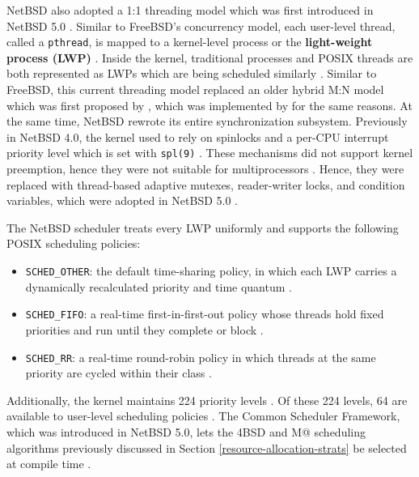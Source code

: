 NetBSD also adopted a 1:1 threading model which was first introduced in NetBSD 5.0 \parencite{rasiukevicius2009}.
Similar to FreeBSD's concurrency model, each user-level thread, called a \texttt{pthread}, is mapped to a kernel-level
process or the \textbf{light-weight process (LWP)} \parencite{rasiukevicius2009}. Inside the kernel, traditional processes
and POSIX threads are both represented as LWPs which are being scheduled similarly \parencite{rasiukevicius2009}.
Similar to FreeBSD, this current threading model replaced an older hybrid M:N model which was first proposed by
\textcite{anderson1991}, which was implemented by \textcite{williams_scheduler} for the same reasons. At the same time,
NetBSD rewrote its entire synchronization subsystem. Previously in NetBSD 4.0, the kernel used to rely on spinlocks
and a per-CPU interrupt priority level which is set with \texttt{spl(9)} \parencite{netbsd_locking}. These mechanisms
did not support kernel preemption, hence they were not suitable for multiprocessors \parencite{netbsd_locking}. Hence,
they were replaced with thread-based adaptive mutexes, reader-writer locks, and condition variables, which were adopted
in NetBSD 5.0 \parencite{netbsd_locking}.

The NetBSD scheduler treats every LWP uniformly and supports the following POSIX scheduling policies:

\begin{itemize}
	\item \texttt{SCHED\_OTHER}: the default time-sharing policy, in which each LWP carries a dynamically recalculated
	      priority and time quantum \parencite{rasiukevicius2009}.

	\item \texttt{SCHED\_FIFO}: a real-time first-in-first-out policy whose threads hold fixed priorities and run until
	      they complete or block \parencite{rasiukevicius2009}.

	\item \texttt{SCHED\_RR}: a real-time round-robin policy in which threads at the same priority are cycled
	      within their class \parencite{rasiukevicius2009}.
\end{itemize}

\noindent
Additionally, the kernel maintains 224 priority levels \parencite{sh4nnu2020}. Of these 224 levels, 64 are available
to user-level scheduling policies \parencite{sh4nnu2020}. The Common Scheduler Framework, which was introduced in
NetBSD 5.0, lets the 4BSD and M@ scheduling algorithms previously discussed in Section \ref{resource-allocation-strats}
be selected at compile time \parencite{sh4nnu2020}.


